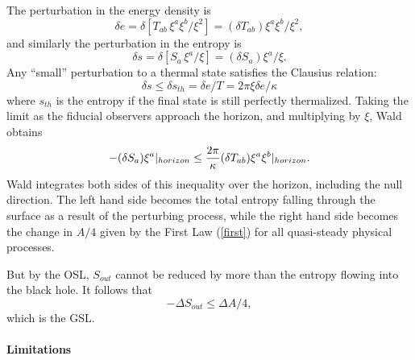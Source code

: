 \documentclass[12pt]{article}
\begin{document}
The perturbation in the energy density is
\begin{equation}
\delta e = \delta [T_{ab}\,\xi^a \xi^b / \xi^2] = (\delta T_{ab}) \xi^a \xi^b / \xi^2,
\end{equation}
and similarly the perturbation in the entropy is
\begin{equation}
\delta s = \delta [S_{a}\,\xi^a / \xi] = (\delta S_{a}) \xi^a / \xi.
\end{equation}
Any ``small'' perturbation to a thermal state satisfies the Clausius relation:
\begin{equation}\label{Clausius}
\delta s \le \delta s_{th} = \delta e / T = 2\pi \xi \delta e / \kappa
\end{equation}
where $s_{th}$ is the entropy if the final state is still perfectly thermalized.  Taking the limit as the fiducial observers approach the horizon, and multiplying by $\xi$, Wald obtains
\begin{equation}\label{tofirst}
-(\delta S_a) \xi^a |_{horizon} \le 
{2\pi \over \kappa} (\delta T_{ab})\xi^a \xi^b |_{horizon}.
\end{equation}
Wald integrates both sides of this inequality over the horizon, including the null direction.  The left hand side becomes the total entropy falling through the surface as a result of the perturbing process, while the right hand side becomes the change in $A/4$ given by the First Law (\ref{first}) for all quasi-steady physical processes.

But by the OSL, $S_{out}$ cannot be reduced by more than the entropy flowing into the black hole.  It follows that
\begin{equation}\label{GSLresult}
-\Delta S_{out} \le \Delta A/4,
\end{equation}
which is the GSL.

\paragraph{Limitations}
\end{document}
